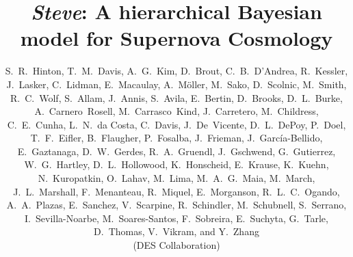 \documentclass[a4paper,fleqn,usenatbib,manuscript]{emulateapj}
\newcommand{\steve}{\textit{Steve}}
\begin{document}
\title{{\steve}: A hierarchical Bayesian model for Supernova Cosmology}

\author{
S.~R.~Hinton,
T.~M.~Davis,
A.~G.~Kim,
D.~Brout,
C.~B.~D'Andrea,
R.~Kessler,
J.~Lasker,
C.~Lidman,
E.~Macaulay,
A.~M\"oller,
M.~Sako,
D.~Scolnic,
M.~Smith,
R.~C.~Wolf,
S.~Allam,
J.~Annis,
S.~Avila,
E.~Bertin,
D.~Brooks,
D.~L.~Burke,
A.~Carnero~Rosell,
M.~Carrasco~Kind,
J.~Carretero,
M.~Childress,
C.~E.~Cunha,
L.~N.~da Costa,
C.~Davis,
J.~De~Vicente,
D.~L.~DePoy,
P.~Doel,
T.~F.~Eifler,
B.~Flaugher,
P.~Fosalba,
J.~Frieman,
J.~Garc\'ia-Bellido,
E.~Gaztanaga,
D.~W.~Gerdes,
R.~A.~Gruendl,
J.~Gschwend,
G.~Gutierrez,
W.~G.~Hartley,
D.~L.~Hollowood,
K.~Honscheid,
E.~Krause,
K.~Kuehn,
N.~Kuropatkin,
O.~Lahav,
M.~Lima,
M.~A.~G.~Maia,
M.~March,
J.~L.~Marshall,
F.~Menanteau,
R.~Miquel,
E.~Morganson,
R.~L.~C.~Ogando,
A.~A.~Plazas,
E.~Sanchez,
V.~Scarpine,
R.~Schindler,
M.~Schubnell,
S.~Serrano,
I.~Sevilla-Noarbe,
M.~Soares-Santos,
F.~Sobreira,
E.~Suchyta,
G.~Tarle,
D.~Thomas,
V.~Vikram,
and Y.~Zhang
\\ \vspace{0.2cm} (DES Collaboration) \\
}
\end{document}
